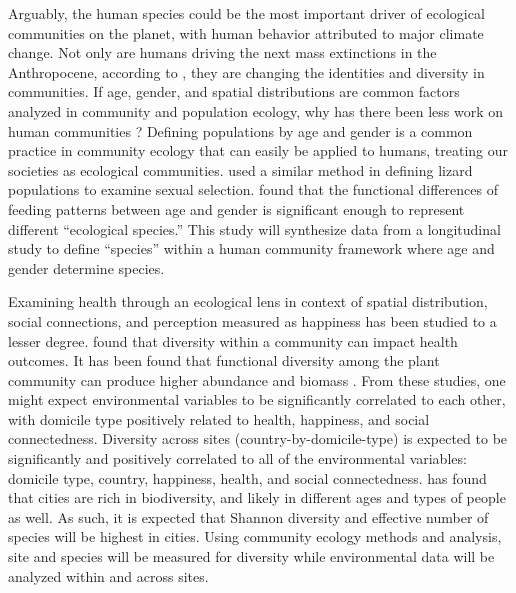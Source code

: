 Arguably, the human species could be the most important driver of
ecological communities on the planet, with human behavior attributed to
major climate change. Not only are humans driving the next mass
extinctions in the Anthropocene, according to \citet{Tilman}, they are
changing the identities and diversity in communities. If age, gender,
and spatial distributions are common factors analyzed in community and
population ecology, why has there been less work on human communities
\citep{McKenzie}? Defining populations by age and gender is a common
practice in community ecology that can easily be applied to humans,
treating our societies as ecological communities. \citet{Dreiss} used a
similar method in defining lizard populations to examine sexual
selection. \citet{Polis} found that the functional differences of
feeding patterns between age and gender is significant enough to
represent different ``ecological species.'' This study will synthesize
data from a longitudinal study to define ``species'' within a human
community framework where age and gender determine species.

Examining health through an ecological lens in context of spatial
distribution, social connections, and perception measured as happiness
has been studied to a lesser degree. \citet{Winterton} found that
diversity within a community can impact health outcomes. It has been
found that functional diversity among the plant community can produce
higher abundance and biomass \citep{Tilman}. From these studies, one
might expect environmental variables to be significantly correlated to
each other, with domicile type positively related to health, happiness,
and social connectedness. Diversity across sites
(country-by-domicile-type) is expected to be significantly and
positively correlated to all of the environmental variables: domicile
type, country, happiness, health, and social connectedness.
\citet{Planchuelo} has found that cities are rich in biodiversity, and
likely in different ages and types of people as well. As such, it is
expected that Shannon diversity and effective number of species will be
highest in cities. Using community ecology methods and analysis, site
and species will be measured for diversity while environmental data will
be analyzed within and across sites.

